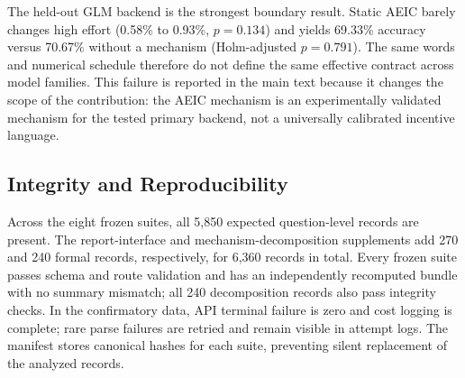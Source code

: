The held-out GLM backend is the strongest boundary result. Static AEIC barely changes high effort (0.58\% to 0.93\%, $p=0.134$) and yields 69.33\% accuracy versus 70.67\% without a mechanism (Holm-adjusted $p=0.791$). The same words and numerical schedule therefore do not define the same effective contract across model families. This failure is reported in the main text because it changes the scope of the contribution: the AEIC mechanism is an experimentally validated mechanism for the tested primary backend, not a universally calibrated incentive language.

\subsection{Integrity and Reproducibility}

Across the eight frozen suites, all 5,850 expected question-level records are present. The report-interface and mechanism-decomposition supplements add 270 and 240 formal records, respectively, for 6,360 records in total. Every frozen suite passes schema and route validation and has an independently recomputed bundle with no summary mismatch; all 240 decomposition records also pass integrity checks. In the confirmatory data, API terminal failure is zero and cost logging is complete; rare parse failures are retried and remain visible in attempt logs. The manifest stores canonical hashes for each suite, preventing silent replacement of the analyzed records.
